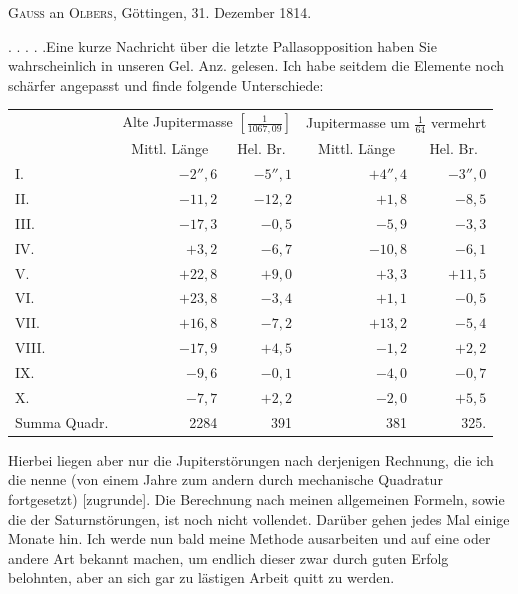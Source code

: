 \par{}\bigskip
\begin{center}
\textsc{Gauss} an \textsc{Olbers}, Göttingen, 31. Dezember 1814.
\end{center}
\noindent\hspace*{\parindent}. . . . .\quad Eine kurze Nachricht über die letzte Pallasopposition haben Sie wahrscheinlich in unseren Gel. Anz. gelesen. Ich habe seitdem die Elemente noch schärfer angepasst und finde folgende Unterschiede:
\begin{center}
\begingroup\small\setlength{\tabcolsep}{5pt}
\begin{tabular}{@{}lrrrr@{}}
&\multicolumn{2}{c}{Alte Jupitermasse \(\left[\frac{1}{1067{,}09}\right]\)}&\multicolumn{2}{c}{Jupitermasse um \(\frac{1}{64}\) vermehrt}\\[3pt]
&\multicolumn{1}{c}{Mittl. Länge}&\multicolumn{1}{c}{Hel. Br.}&\multicolumn{1}{c}{Mittl. Länge}&\multicolumn{1}{c}{Hel. Br.}\\
I.&\(-2''{,}6\)&\(-5''{,}1\)&\(+4''{,}4\)&\(-3''{,}0\)\\
II.&\(-11{,}2\)&\(-12{,}2\)&\(+1{,}8\)&\(-8{,}5\)\\
III.&\(-17{,}3\)&\(-0{,}5\)&\(-5{,}9\)&\(-3{,}3\)\\
IV.&\(+3{,}2\)&\(-6{,}7\)&\(-10{,}8\)&\(-6{,}1\)\\
V.&\(+22{,}8\)&\(+9{,}0\)&\(+3{,}3\)&\(+11{,}5\)\\
VI.&\(+23{,}8\)&\(-3{,}4\)&\(+1{,}1\)&\(-0{,}5\)\\
VII.&\(+16{,}8\)&\(-7{,}2\)&\(+13{,}2\)&\(-5{,}4\)\\
VIII.&\(-17{,}9\)&\(+4{,}5\)&\(-1{,}2\)&\(+2{,}2\)\\
IX.&\(-9{,}6\)&\(-0{,}1\)&\(-4{,}0\)&\(-0{,}7\)\\
X.&\(-7{,}7\)&\(+2{,}2\)&\(-2{,}0\)&\(+5{,}5\)\\
Summa Quadr.&2284&391&381&325.
\end{tabular}
\endgroup
\end{center}
\par{}Hierbei liegen aber nur die Jupiterstörungen nach derjenigen Rechnung, die ich die  nenne (von einem Jahre zum andern durch mechanische Quadratur fortgesetzt) [zugrunde]. Die Berechnung nach meinen allgemeinen Formeln, sowie die der Saturnstörungen, ist noch nicht vollendet. Darüber gehen jedes Mal einige Monate hin. Ich werde nun bald meine Methode ausarbeiten und auf eine oder andere Art bekannt machen, um endlich dieser zwar durch guten Erfolg belohnten, aber an sich gar zu lästigen Arbeit quitt zu werden.
\par
